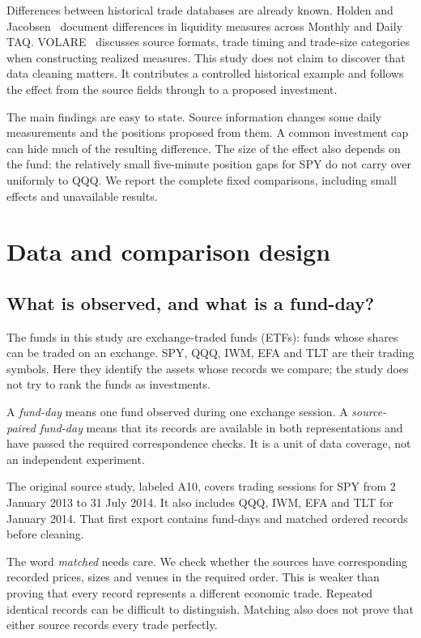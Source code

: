 Differences between historical trade databases are already known. Holden and Jacobsen~\cite{holden} document differences in liquidity measures across Monthly and Daily TAQ. VOLARE~\cite{volare} discusses source formats, trade timing and trade-size categories when constructing realized measures. This study does not claim to discover that data cleaning matters. It contributes a controlled historical example and follows the effect from the source fields through to a proposed investment.

The main findings are easy to state. Source information changes some daily measurements and the positions proposed from them. A common investment cap can hide much of the resulting difference. The size of the effect also depends on the fund: the relatively small five-minute position gaps for SPY do not carry over uniformly to QQQ. We report the complete fixed comparisons, including small effects and unavailable results.

\section{Data and comparison design}\label{sec:data}
\subsection{What is observed, and what is a fund-day?}
The funds in this study are exchange-traded funds (ETFs): funds whose shares can be traded on an exchange. SPY, QQQ, IWM, EFA and TLT are their trading symbols. Here they identify the assets whose records we compare; the study does not try to rank the funds as investments.

A \emph{fund-day} means one fund observed during one exchange session. A \emph{source-paired fund-day} means that its records are available in both representations and have passed the required correspondence checks. It is a unit of data coverage, not an independent experiment.

The original source study, labeled A10, covers  trading sessions for SPY from 2 January 2013 to 31 July 2014. It also includes QQQ, IWM, EFA and TLT for January 2014. That first export contains  fund-days and  matched ordered records before cleaning.

The word \emph{matched} needs care. We check whether the sources have corresponding recorded prices, sizes and venues in the required order. This is weaker than proving that every record represents a different economic trade. Repeated identical records can be difficult to distinguish. Matching also does not prove that either source records every trade perfectly.

